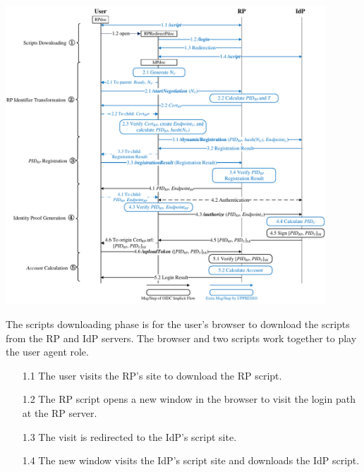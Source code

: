\vspace{1mm}
\begin{strip}
\centering\includegraphics[width=0.9\textwidth]{fig/process-js.pdf}
\label{fig:process}
\vspace{-5mm}
\end{strip}

The scripts downloading phase is for the user's browser to download the scripts from the RP and IdP servers. The browser and two scripts work together to play the user agent role.
\vspace{-\topsep}
\begin{itemize}
\item[1.1] The user visits the RP's site to download the RP script.
\vspace{-\topsep}
\item[1.2] The RP script opens a new window in the browser to visit the login path at the RP server.
\vspace{-\topsep}
\item[1.3] The visit is redirected to the IdP's script site.
\vspace{-\topsep}
\item[1.4] The new window visits the IdP's script site and downloads the IdP script.
\end{itemize}
\vspace{-\topsep}



